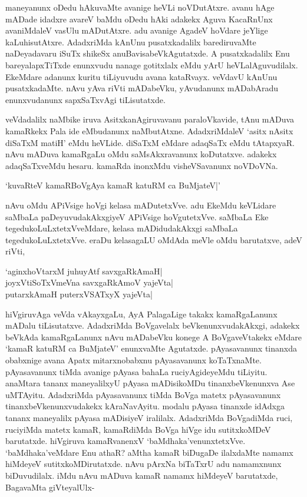 maneyanunx oDedu hAkuvaMte avanige heVLi noVDutAtxre. avanu hAge mADade idadxre avareV baMdu oDedu hAki adakekx Aguva KacaRnUnx avaniMdaleV vasUlu mADutAtxre. adu avanige AgadeV hoVdare jeYlige kaLuhisutAtxre. AdadxriMda kAnUnu pusatxkadalilx barediruvaMte naDeyadavaru iSuTx shikeSx anuBavisabeVkAgutatxde. A pusatxkadalilx Enu bareyalapxTiTxde enunxvudu nanage gotitxlalx eMdu yArU heVLalAguvudilalx. EkeMdare adanunx kuritu tiLiyuvudu avana kataRvayx. veVdavU kAnUnu pusatxkadaMte. nAvu yAva riVti mADabeVku, yAvudanunx mADabAradu enunxvudanunx sapxSaTxvAgi tiLisutatxde.

veVdadalilx naMbike iruva AsitxkanAgiruvavanu paraloVkavide, tAnu mADuva kamaRkekx Pala ide eMbudanunx naMbutAtxne. AdadxriMdaleV `asitx nAsitx diSaTxM matiH' eMdu heVLide. diSaTxM eMdare adaqSaTx eMdu tAtapxyaR. nAvu mADuva kamaRgaLu oMdu saMsAkxravanunx koDutatxve. adakekx adaqSaTxveMdu hesaru. kamaRda inonxMdu visheVSavanunx noVDoVNa.

\begin{shloka}
`kuvaRteV kamaRBoVgAya kamaR katuRM ca BuMjateV|'
\end{shloka}

nAvu oMdu APiVsige hoVgi kelasa mADutetxVve. adu EkeMdu keVLidare saMbaLa paDeyuvudakAkxgiyeV APiVsige hoVgutetxVve. saMbaLa Eke tegedukoLuLxtetxVveMdare, kelasa mADidudakAkxgi saMbaLa tegedukoLuLxtetxVve. eraDu kelasagaLU oMdAda meVle oMdu barutatxve, adeV riVti,

\begin{shloka}
`aginxhoVtarxM ju{}huyAtf savxgaRkAmaH|\\
joyxVtiSoTxVmeVna savxgaRkAmoV yajeVta|\\
putarxkAmaH puterxVSATxyX yajeVta|
\end{shloka}

hiVgiruvAga veVda vAkayxgaLu, AyA PalagaLige takakx kamaRgaLanunx mADalu tiLisutatxve. AdadxriMda BoVgavelalx beVkenunxvudakAkxgi, adakekx beVkAda kamaRgaLanunx nAvu mADabeVku konege A BoVgaveVtakekx eMdare `kamaR katuRM ca BuMjateV' enunxvaMte Agutatxde. pAyasavanunx tinanxda obabxnige avana Apatx mitarxnobabxnu pAyasavanunx koTaTxnaMte. pAyasavanunx tiMda avanige pAyasa bahaLa ruciyAgideyeMdu tiLiyitu. anaMtara tananx maneyalilxyU pAyasa mADisikoMDu tinanxbeVkenunxva Ase uMTAyitu. AdadxriMda pAyasavanunx tiMda BoVga matetx pAyasavanunx tinanxbeVkenunxvudakekx kAraNavAyitu. modalu pAyasa tinanxde idAdxga tananx maneyalilx pAyasa mADisiyeV iralilalx. AdadxriMda BoVgadiMda ruci, ruciyiMda matetx kamaR, kamaRdiMda BoVga hiVge idu sutitxkoMDeV barutatxde. hiVgiruva kamaRvanenxV `baMdhaka'venunxtetxVve. `baMdhaka'veMdare Enu athaR? aMtha kamaR biDugaDe ilalxdaMte namamx hiMdeyeV sutitxkoMDirutatxde. nAvu pArxNa biTaTxrU adu namamxnunx biDuvudilalx. iMdu nAvu mADuva kamaR namamx hiMdeyeV barutatxde, BagavaMta giVteyalUlx-

